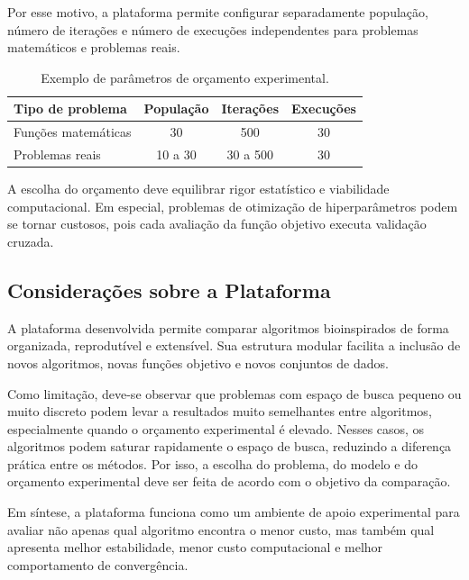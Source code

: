 Por esse motivo, a plataforma permite configurar separadamente população, número de iterações e número de execuções independentes para problemas matemáticos e problemas reais.

\begin{table}[htbp]
\centering
\caption{Exemplo de parâmetros de orçamento experimental.}
\label{tab:orcamento-plataforma}
\begin{tabular}{lccc}
\toprule
\textbf{Tipo de problema} & \textbf{População} & \textbf{Iterações} & \textbf{Execuções}\\
\midrule
Funções matemáticas & 30 & 500 & 30\\
Problemas reais & 10 a 30 & 30 a 500 & 30\\
\bottomrule
\end{tabular}
\end{table}

A escolha do orçamento deve equilibrar rigor estatístico e viabilidade computacional. Em especial, problemas de otimização de hiperparâmetros podem se tornar custosos, pois cada avaliação da função objetivo executa validação cruzada.

\subsection{Considerações sobre a Plataforma}

A plataforma desenvolvida permite comparar algoritmos bioinspirados de forma organizada, reprodutível e extensível. Sua estrutura modular facilita a inclusão de novos algoritmos, novas funções objetivo e novos conjuntos de dados.

Como limitação, deve-se observar que problemas com espaço de busca pequeno ou muito discreto podem levar a resultados muito semelhantes entre algoritmos, especialmente quando o orçamento experimental é elevado. Nesses casos, os algoritmos podem saturar rapidamente o espaço de busca, reduzindo a diferença prática entre os métodos. Por isso, a escolha do problema, do modelo e do orçamento experimental deve ser feita de acordo com o objetivo da comparação.

Em síntese, a plataforma funciona como um ambiente de apoio experimental para avaliar não apenas qual algoritmo encontra o menor custo, mas também qual apresenta melhor estabilidade, menor custo computacional e melhor comportamento de convergência.
